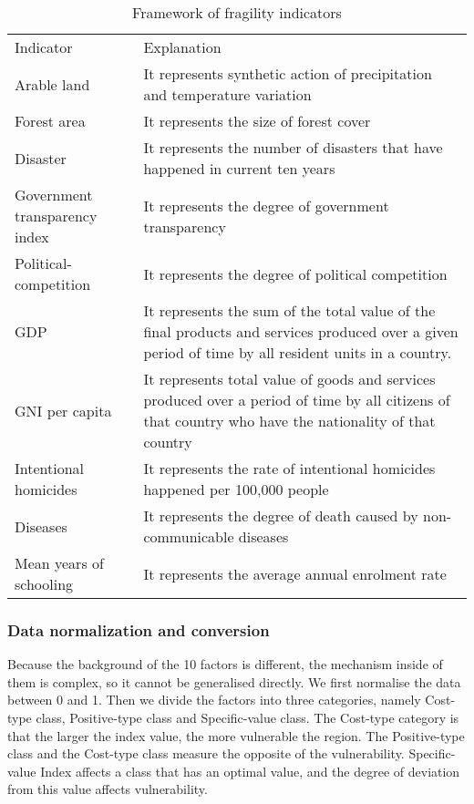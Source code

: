 \documentclass{mcmthesis}
\begin{document}
				\begin{longtable}{p{4cm} p{10cm} }
					
					\caption{\label{indicators}Framework of fragility indicators}\\
					Indicator  & Explanation \\
					\noalign{\global\arrayrulewidth1pt}\hline\noalign{\global\arrayrulewidth0.4pt}
					Arable land & It represents synthetic action of precipitation and temperature variation\\
					Forest area  & It represents the size of forest cover\\
					Disaster & It represents the number of  disasters that have happened in current ten years \\
					Government transparency index& It represents the degree of government transparency\\
					Political-competition & It represents the degree of political competition\\
					GDP  & It represents the sum of the total value of the final products and services produced over a given period of time by all resident units in a country.\\
					GNI per capita  & It represents total value of goods and services produced over a period of time by all citizens of that country who have the nationality of that country\\
					Intentional homicides  & It represents the rate of intentional homicides happened per 100,000 people\\
					Diseases & It represents the degree of death caused by non-communicable diseases \\
					Mean years of schooling & It represents the average annual enrolment rate \\
					\hline
				\end{longtable}
				
			
			\subsubsection{Data normalization and conversion}
				
				Because the background of the 10 factors is different, the mechanism inside of them is complex, so it cannot be generalised directly. We first normalise the data between 0 and 1. Then we divide the factors into three categories, namely Cost-type class, Positive-type class and Specific-value class. The Cost-type category is that the larger the index value, the more vulnerable the region. The Positive-type class and the Cost-type class measure the opposite of the vulnerability. Specific-value Index affects a class that has an optimal value, and the degree of deviation from this value affects vulnerability.
				
\end{document}
